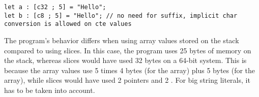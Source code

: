 \begin{lstlisting}[style=coloredverbatim]
let a : [c32 ; 5] = "Hello";
let b : [c8 ; 5] = "Hello"; // no need for suffix, implicit char conversion is allowed on cte values
\end{lstlisting}

The program's behavior differs when using array values stored on the stack
compared to using slices. In this case, the program uses 25 bytes of memory on
the stack, whereas slices would have used 32 bytes on a 64-bit system. This is
because the array values use 5 times 4 bytes (for the  array) plus 5
bytes (for the  array), while slices would have used 2 pointers and 2
. For big string literals, it has to be taken into account.

\vfill%
\pagebreak
